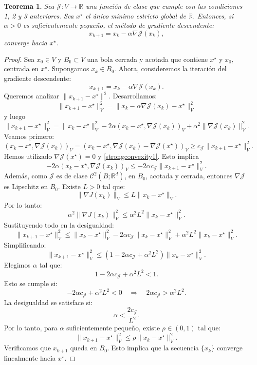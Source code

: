 \documentclass[12pt]{book}
\newtheorem{theorem}{Teorema}
\theoremstyle{definition}
\theoremstyle{plain}
\theoremstyle{remark}
\begin{document}
\begin{theorem}
Sea \( \mathcal{J}: V \to \mathbb{R} \) una función de clase %
que cumple con las condiciones 1, 2 y 3 anteriores.
Sea \( x^\star \) el único mínimo estricto global de \( \mathbb{R} \). %
Entonces, si %
\( \alpha > 0 \) es suficientemente pequeño, el método de gradiente descendente:
\[
x_{k+1} = x_k - \alpha \nabla \mathcal{J}(x_k),
\]
converge hacia \( x^\star \).
\end{theorem}

\begin{proof}
Sea $x_0 \in V$ y $B_0 \subset V$ una bola cerrada y acotada que contiene $x^\star$ y $x_0$, centrada en $x^\star$. Supongamos $x_k \in B_0$.
Ahora, consideremos la iteración del gradiente descendente:
\[
x_{k+1} = x_k - \alpha \nabla \mathcal{J}(x_k).
\]
Queremos analizar \( \|x_{k+1} - x^\star\|^2 \). Desarrollamos:
\[
\|x_{k+1} - x^\star\|_V^2 = \|x_k - \alpha \nabla \mathcal{J}(x_k) - x^\star\|_V^2 %
\]
y luego
\[
\|x_{k+1} - x^\star\|_V^2  %
= \|x_k - x^\star\|_V^2 - 2\alpha (x_k - x^\star ,  \nabla \mathcal{J}(x_k) )_V + \alpha^2 \|\nabla \mathcal{J}(x_k)\|_V^2.
\]
Veamos primero:
\[
(x_k - x^\star ,  \nabla \mathcal{J}(x_k) )_V
=
(x_k - x^\star ,  \nabla \mathcal{J}(x_k) - \nabla \mathcal{J}(x^\star) )_V
\geq
c_{\mathcal{J}}
\|x_{k+1} - x^\star\|_V^2.
\]
Hemos utilizado $\nabla \mathcal{J}(x^\star) = 0$ y \eqref{strongconvexity1}.
Esto implica
\[
- 2 \alpha
(x_k - x^\star ,  \nabla \mathcal{J}(x_k) )_V
\leq 
-2 \alpha
c_{\mathcal{J}}
\|x_{k+1} - x^\star\|_V^2.
\]
%
%
Además, como 
$\mathcal{J}$ es de clase $\mathscr{C}^2(B;\mathbb{R}^d)$, en $B_0$, acotada y cerrada, entonces
\( \nabla \mathcal{J} \) es Lipschitz en \( B_0 \). %
Existe \( L > 0 \) tal que:
\[
\|\nabla J(x_k)\|_V \leq L \|x_k - x^\star\|_V.
\]
Por lo tanto:
\[
\alpha^2 \|\nabla J(x_k)\|^2_V \leq \alpha^2 L^2 \|x_k - x^\star\|^2_V.
\]
%
%
Sustituyendo todo en la desigualdad:
\[
\|x_{k+1} - x^\star\|_V^2 \leq \|x_k - x^\star\|_V^2 - 2\alpha c_{\mathcal{J}} \|x_k - x^\star\|_V^2 +  \alpha^2 L^2 \|x_k - x^\star\|_V^2.
\]
Simplificando:
\[
\|x_{k+1} - x^\star\|^2_V \leq \left(1 - 2\alpha 
c_{\mathcal{J}} + \alpha^2 L^2\right) \|x_k - x^\star\|^2_V.
\]
%
Elegimos \( \alpha \) tal que:
\[
1 - 2\alpha c_{\mathcal{J}}  + \alpha^2 L^2 < 1.
\]
Esto se cumple si:
\[
-2\alpha c_{\mathcal{J}} +  \alpha^2 L^2 < 0 \quad \Rightarrow \quad 2 \alpha  c_{\mathcal{J}} > \alpha^2 L^2.
\]
La desigualdad se satisface si:
\[
\alpha < \frac{2 c_{\mathcal{J}}}{L^2}.
\]
Por lo tanto, para \( \alpha \) suficientemente pequeño, existe \( \rho \in (0,1) \) tal que:
\[
\|x_{k+1} - x^\star\|^2_V \leq \rho \|x_k - x^\star\|^2_V.
\]
Verificamos que $x_{k+1}$ queda en $B_0$.
Esto implica que la secuencia \( \{x_k\} \) converge linealmente hacia \( x^\star \).
\end{proof}
\end{document}
